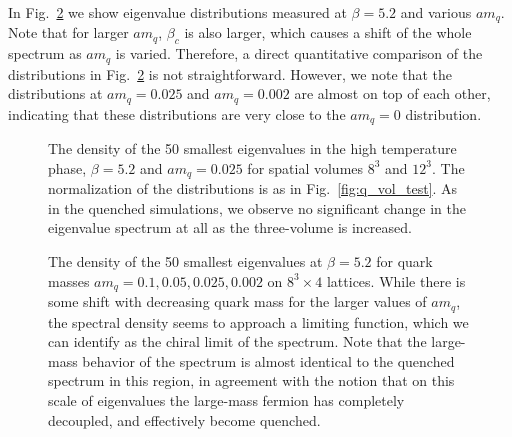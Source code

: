 \documentclass[11pt]{article}
\begin{document}
In Fig.~\ref{fig:various_dynamical} we show
eigenvalue distributions measured at $\beta=5.2$ and various $am_q$.
Note that for larger $am_q$, $\beta_c$ is also larger,
which causes a shift of the whole spectrum as $am_q$ is varied.
Therefore, a direct quantitative
comparison of the distributions in Fig.~\ref{fig:various_dynamical}
is not straightforward. 
However, we note that the distributions at  $am_q=0.025$ and $am_q=0.002$
are almost on top of each other, indicating that these distributions
are very close to the $am_q=0$ distribution.

\begin{figure}
\begin{center}
\textwidth
{}
\end{center}
\vspace*{-2mm}
\caption{The density of the 50 smallest eigenvalues in the high temperature
phase, $\beta=5.2$ and $am_q=0.025$ for spatial volumes $8^3$ and $12^3$.
The normalization of the distributions is as in Fig.~\ref{fig:q_vol_test}.
As in the quenched simulations, we observe no significant change in the 
eigenvalue spectrum at all as the three-volume is increased.}
\label{fig:d_vol_test}
\end{figure}

\begin{figure}
\begin{center}
\textwidth
{}
\end{center}
\vspace*{-2mm}
\caption{The density of the 50 smallest eigenvalues at $\beta=5.2$ for quark 
masses $am_q=0.1, 0.05, 0.025, 0.002$ on $8^3 \times 4$ lattices.
While there is some shift with decreasing quark mass for the larger values
of $am_q$, the spectral density seems to approach a limiting function, which
we can identify as the chiral limit of the spectrum. Note that the 
large-mass behavior of the spectrum is almost identical to the quenched
spectrum in this region, in agreement with the notion that on this scale
of eigenvalues the large-mass fermion has completely decoupled,
and effectively become quenched.}
\label{fig:various_dynamical}
\end{figure}
\end{document}
